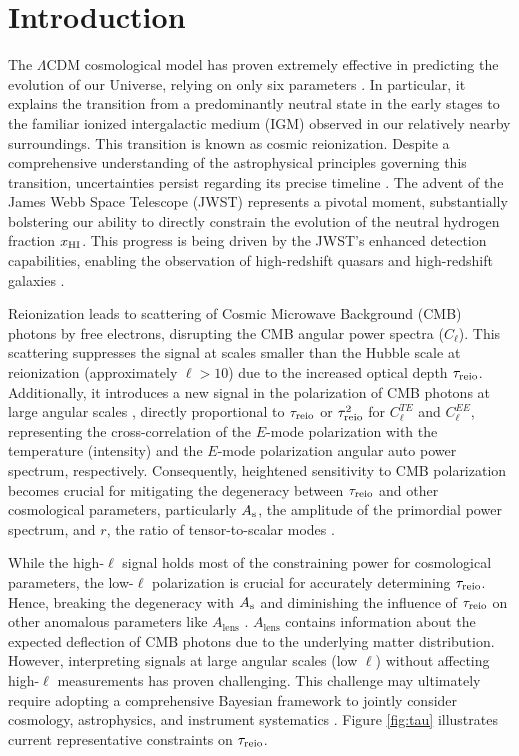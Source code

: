 \section*{Introduction}


The $\Lambda$CDM cosmological model has proven extremely effective in
predicting the evolution of our Universe, relying on only six parameters
\cite{Planck2020a}.
In particular, it explains the transition from a predominantly neutral
state in the early stages to the familiar ionized intergalactic medium
(IGM) observed in our relatively nearby surroundings.
This transition is known as cosmic reionization.
Despite a comprehensive understanding of the astrophysical principles
governing this transition, uncertainties persist regarding its precise
timeline \cite{Jin2023}.
The advent of the James Webb Space Telescope (JWST) \cite{Gardner2006}
represents a pivotal moment, substantially bolstering our ability to
directly constrain the evolution of the neutral hydrogen fraction
$x_{\mathrm{HI}}$.
This progress is being driven by the JWST's enhanced detection
capabilities, enabling the observation of high-redshift quasars
\cite{Eilers2023} and high-redshift galaxies
\cite{Adams2023,Bradley2023,Donnan2023}.

Reionization leads to scattering of Cosmic Microwave Background (CMB)
photons by free electrons, disrupting the CMB angular power spectra
($C_{\ell}$).
This scattering suppresses the signal at scales smaller than the Hubble
scale at reionization (approximately $\ell>10$) \cite{Planck2020b} due
to the increased optical depth $\tau_{\mathrm{reio}}$.
Additionally, it introduces a new signal in the polarization of CMB
photons at large angular scales \cite{Planck2020a}, directly
proportional to $\tau_{\mathrm{reio}}$ or $\tau_{\mathrm{reio}}^2$ for $C^{TE}_\ell$ and
$C^{EE}_\ell$, representing the cross-correlation of the $E$-mode
polarization with the temperature (intensity) and the $E$-mode
polarization angular auto power spectrum, respectively.
Consequently, heightened sensitivity to CMB polarization becomes crucial
for mitigating the degeneracy between $\tau_{\mathrm{reio}}$ and other
cosmological parameters, particularly $A_\mathrm{s}$, the amplitude of the
primordial power spectrum, and $r$, the ratio of tensor-to-scalar modes
\cite{Natale2020}.

While the high-$\ell$ signal holds most of the constraining power for
cosmological parameters, the low-$\ell$ polarization is crucial for
accurately determining $\tau_{\mathrm{reio}}$.
Hence, breaking the degeneracy with $A_\mathrm{s}$ and diminishing the influence
of $\tau_{\mathrm{reio}}$ on other anomalous parameters like $A_\mathrm{lens}$
\cite{Giare2023}.
$A_\mathrm{lens}$ contains information about the expected deflection of
CMB photons due to the underlying matter distribution.
However, interpreting signals at large angular scales (low $\ell$)
without affecting high-$\ell$ measurements has proven challenging.
This challenge may ultimately require adopting a comprehensive Bayesian
framework to jointly consider cosmology, astrophysics, and instrument
systematics \cite{Paradiso2023}.
Figure \ref{fig:tau} illustrates current representative constraints on
$\tau_{\mathrm{reio}}$.

